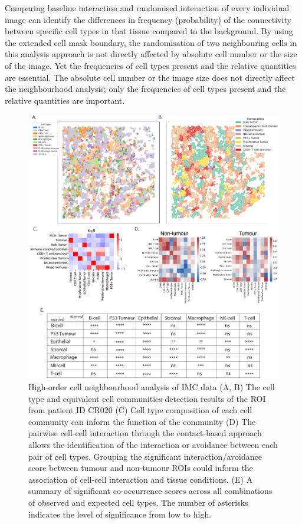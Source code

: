 Comparing baseline interaction and randomised interaction of every individual image can identify the differences in frequency (probability) of the connectivity between specific cell types in that tissue compared to the background. By using the extended cell mask boundary, the randomisation of two neighbouring cells in this analysis approach is not directly affected by absolute cell number or the size of the image. Yet the frequencies of cell types present and the relative quantities are essential. The absolute cell number or the image size does not directly affect the neighbourhood analysis; only the frequencies of cell types present and the relative quantities are important. 

\begin{figure}[hp]
    \centering
    \includegraphics[width=0.94\columnwidth]{Chapter3/Figures/Chap3_figure4_v2.png}
    \caption[High-order cell neighbourhood analysis of IMC data]{High-order cell neighbourhood analysis of IMC data (A, B) The cell type and equivalent cell communities detection results of the ROI from patient ID CR020 (C) Cell type composition of each cell community can inform the function of the community  (D) The pairwise cell-cell interaction through the contact-based approach allows the identification of the interaction or avoidance between each pair of cell types. Grouping the significant interaction/avoidance score between tumour and non-tumour ROIs could inform the association of cell-cell interaction and tissue conditions. (E) A summary of significant co-occurrence scores across all combinations of observed and expected cell types. The number of asterisks indicates the level of significance from low to high.}
    \label{fig:colorectal_cancer_IMC}
    
\end{figure}

